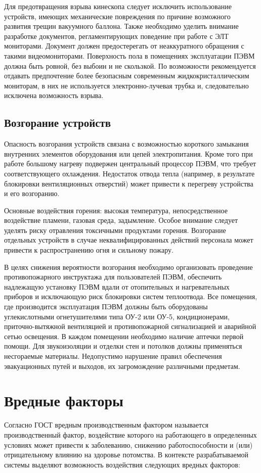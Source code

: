 \documentclass[14pt,oneside,final]{extreport}
\begin{document}
	Для предотвращения взрыва кинескопа следует исключить использование устройств, имеющих механические повреждения по причине возможного развития трещин вакуумного баллона. Также необходимо уделить внимание разработке документов, регламентирующих поведение при работе с ЭЛТ мониторами. Документ должен предостерегать от неаккуратного обращения с такими видеомониторами. Поверхность пола в помещениях эксплуатации ПЭВМ должна быть ровной, без выбоин и не скользкой. По возможности рекомендуется отдавать предпочтение более безопасным современным жидкокристаллическим мониторам, в них не используется электронно-лучевая трубка и, следовательно исключена возможность взрыва.
	\subsection{Возгорание устройств}
	Опасность возгорания устройств связана с возможностью короткого замыкания внутренних элементов оборудования или цепей электропитания. Кроме того при работе большому нагреву подвержен центральный процессор ПЭВМ, что требует соответствующего охлаждения. Недостаток отвода тепла (например, в результате блокировки вентиляционных отверстий) может привести к перегреву устройства и его возгоранию.    
	
	Основные воздействия горения: высокая температура, непосредственное воздействие пламени, газовая среда, задымление. Особое внимание следует уделять риску отравления токсичными продуктами горения. Возгорание отдельных устройств в случае неквалифицированных действий персонала может привести к распространению огня и сильному пожару. 
	
	В целях снижения вероятности возгорания необходимо организовать проведение противопожарного инструктажа для пользователей ПЭВМ, обеспечить надлежащую установку ПЭВМ вдали от отопительных и нагревательных приборов и исключающую риск блокировки систем теплоотвода.	Все помещения, где производится эксплуатация ПЭВМ должны быть оборудованы углекислотными огнетушителями  типа \mbox{ОУ-2} или \mbox{ОУ-5}, кондиционерами, приточно-вытяжной вентиляцией и противопожарной сигнализацией и аварийной сетью освещения. В каждом помещении необходимо наличие аптечки первой помощи. Для звукоизоляции и отделки стен и потолков должны применяться несгораемые материалы. Недопустимо нарушение правил обеспечения эвакуационных путей и выходов, их загромождение различными предметам. 
	
	\section{Вредные факторы}
	Согласно ГОСТ \cite{gost:120002} вредным производственным фактором называется производственный фактор, воздействие которого на работающего в определенных условиях может привести к заболеванию, снижению работоспособности и (или) отрицательному влиянию на здоровье потомства. В контексте разрабатываемой системы выделяют возможность воздействия следующих вредных факторов:
	
\end{document}
